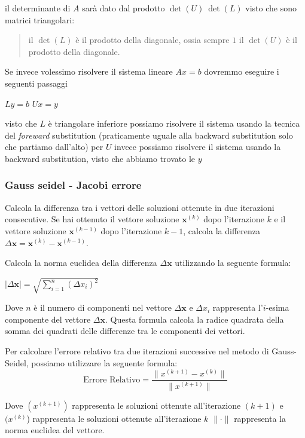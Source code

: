 \documentclass[
]{article}
\begin{document}
il determinante di \(A\) sarà dato dal prodotto
\(\det{(U) \  \det{(L)}}\) visto che sono matrici triangolari:

\begin{quote}
il \(\det(L)\) è il prodotto della diagonale, ossia sempre \(1\) il
\(\det(U)\) è il prodotto della diagonale.
\end{quote}

Se invece volessimo risolvere il sistema lineare \(Ax=b\) dovremmo
eseguire i seguenti passaggi

\(Ly = b\) \(Ux=y\)

visto che \(L\) è triangolare inferiore possiamo risolvere il sistema
usando la tecnica del \emph{foreward} substitution (praticamente uguale
alla backward substitution solo che partiamo dall'alto) per \(U\) invece
possiamo risolvere il sistema usando la backward substitution, visto che
abbiamo trovato le \(y\)

\subsubsection{Gauss seidel - Jacobi
errore}\label{gauss-seidel---jacobi-errore}

Calcola la differenza tra i vettori delle soluzioni ottenute in due
iterazioni consecutive. Se hai ottenuto il vettore soluzione
\(\mathbf{x}^{(k)}\) dopo l'iterazione \(k\) e il vettore soluzione
\(\mathbf{x}^{(k-1)}\) dopo l'iterazione \(k-1\), calcola la differenza
\(\Delta\mathbf{x} = \mathbf{x}^{(k)} - \mathbf{x}^{(k-1)}\).

Calcola la norma euclidea della differenza \(\Delta\mathbf{x}\)
utilizzando la seguente formula:

\(|\Delta\mathbf{x}| = \sqrt{ \sum_{i=1}^{n}(\Delta x_i)^2}\)

Dove \(n\) è il numero di componenti nel vettore \(\Delta\mathbf{x}\) e
\(\Delta x_i\) rappresenta l'\(i\)-esima componente del vettore
\(\Delta\mathbf{x}\). Questa formula calcola la radice quadrata della
somma dei quadrati delle differenze tra le componenti dei vettori.

Per calcolare l'errore relativo tra due iterazioni successive nel metodo
di Gauss-Seidel, possiamo utilizzare la seguente formula: \[
\text{Errore Relativo} = \frac{{\|x^{(k+1)} - x^{(k)}\|}}{{\|x^{(k+1)}\|}}
\]

Dove \((x^{(k+1)})\) rappresenta le soluzioni ottenute all'iterazione
\((k+1)\) e \((x^{(k)}\)) rappresenta le soluzioni ottenute
all'iterazione \(k\) \(\|\cdot\|\) rappresenta la norma euclidea del
vettore.
\end{document}
